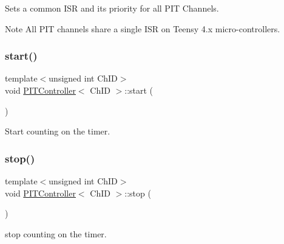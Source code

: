 Sets a common I\+SR and its priority for all P\+IT Channels. 

\begin{DoxyNote}{Note}
All P\+IT channels share a single I\+SR on Teensy 4.\+x micro-\/controllers. 
\end{DoxyNote}
\mbox{\label{classPITController_a4dae1ed0ada64ebc03665e8f39795e7e}} 
\subsubsection{\texorpdfstring{start()}{start()}}
{\footnotesize\ttfamily template$<$unsigned int Ch\+ID$>$ \\
void \hyperlink{classPITController}{P\+I\+T\+Controller}$<$ Ch\+ID $>$\+::start (\begin{DoxyParamCaption}{ }\end{DoxyParamCaption})\hspace{0.3cm}{\ttfamily [inline]}}



Start counting on the timer. 

\mbox{\label{classPITController_a5a6e2b00c6355934531a77a62660bec7}} 
\subsubsection{\texorpdfstring{stop()}{stop()}}
{\footnotesize\ttfamily template$<$unsigned int Ch\+ID$>$ \\
void \hyperlink{classPITController}{P\+I\+T\+Controller}$<$ Ch\+ID $>$\+::stop (\begin{DoxyParamCaption}{ }\end{DoxyParamCaption})\hspace{0.3cm}{\ttfamily [inline]}}



stop counting on the timer. 

\mbox{\label{classPITController_a2b64ce8a01dc1254002c4ff3c384a6fd}} 
